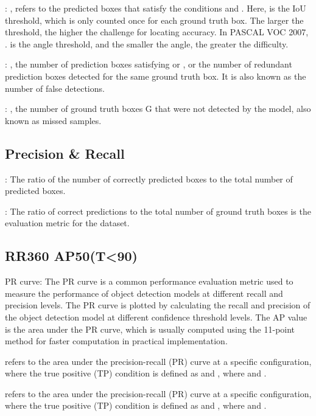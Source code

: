 \documentclass{article}
\begin{document}
: , refers to the predicted boxes  that satisfy the conditions  and . Here,  is the IoU threshold, which is only counted once for each ground truth box. The larger the threshold, the higher the challenge for locating accuracy. In PASCAL VOC 2007, .  is the angle threshold, and the smaller the angle, the greater the difficulty.




: , the number of prediction boxes  satisfying  or , or the number of redundant prediction boxes detected for the same ground truth box. It is also known as the number of false detections.



: , the number of ground truth boxes G that were not detected by the model, also known as missed samples.

\subsection{Precision \& Recall}

: The ratio of the number of correctly predicted boxes to the total number of predicted boxes.



: The ratio of correct predictions to the total number of ground truth boxes is the evaluation metric for the dataset.





\subsection{RR360 AP50(T<90)}



PR curve: The PR curve is a common performance evaluation metric used to measure the performance of object detection models at different recall and precision levels. The PR curve is plotted by calculating the recall and precision of the object detection model at different confidence threshold levels. The AP value is the area under the PR curve, which is usually computed using the 11-point method for faster computation in practical implementation.



 refers to the area under the precision-recall (PR) curve at a specific configuration, where the true positive (TP) condition is defined as  and , where  and .

 refers to the area under the precision-recall (PR) curve at a specific configuration, where the true positive (TP) condition is defined as  and , where  and .
\end{document}
